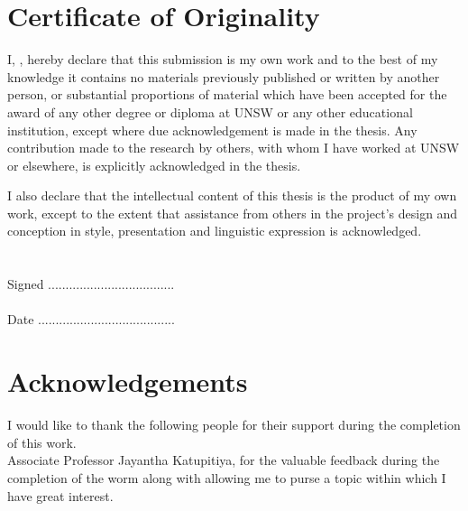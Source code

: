 


\chapter*{Certificate of Originality}
I, \authorname, hereby declare that this submission is my own work and to the best of my knowledge it contains no materials previously published or written by another person, or substantial proportions of material which have been accepted for the award of any other degree or diploma at UNSW or any other educational institution, except where due acknowledgement is made in the thesis. Any contribution made to the research by others, with whom I have worked at UNSW or elsewhere, is explicitly acknowledged in the thesis.

I also declare that the intellectual content of this thesis is the product of my own work, except to the extent that assistance from others in the project’s design and conception in style, presentation and linguistic expression is acknowledged.\\
\\
\\
Signed  ....................................\\
\\
Date    .......................................

\chapter*{Acknowledgements}
I would like to thank the following people for their support during the completion of this work.\\

Associate Professor Jayantha Katupitiya, for the valuable feedback during the completion of the worm along with allowing me to purse a topic within which I have great interest.\\

